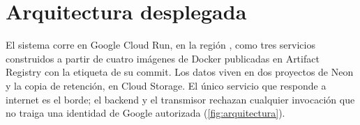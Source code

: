\documentclass[11pt,a4paper]{article}
\theoremstyle{definition}
\theoremstyle{remark}
\begin{document}
%
%
\section{Arquitectura desplegada}
\label{sec:arquitectura}

El sistema corre en Google Cloud Run, en la regi\'on , como
tres servicios construidos a partir de cuatro im\'agenes de Docker publicadas en
Artifact Registry con la etiqueta de su commit. Los datos viven en dos
proyectos de Neon y la copia de retenci\'on, en Cloud Storage. El \'unico
servicio que responde a internet es el borde; el backend y el transmisor
rechazan cualquier invocaci\'on que no traiga una identidad de Google
autorizada (\cref{fig:arquitectura}).
\end{document}
